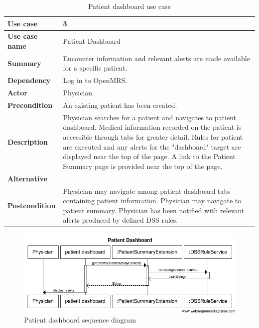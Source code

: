 \documentclass[12pt,letterpaper]{article}
\begin{document}
\begin{table}
\begin{centering}
\begin{tabular}{ |  >{\bfseries}l | p{5in} |} \hline
Use case &
3 \\ \hline
Use case name &
Patient Dashboard \\ \hline
Summary & 
Encounter information and relevant alerts are made available 
for a specific patient. \\ \hline
Dependency &
Log in to OpenMRS. \\ \hline
Actor &
Physician \\ \hline
Precondition &
An existing patient has been created. \\ \hline
Description &
Physician searches for a patient and navigates to patient dashboard. \newline
Medical information recorded on the patient is accessible through tabs for greater detail. \newline
Rules for patient are executed and any alerts for the "dashboard" target 
are displayed near the top of the page. \newline
A link to the Patient Summary page is provided near the top of the page.
\\ \hline
Alternative &
\\ \hline
Postcondition &
Physician may navigate among patient dashboard tabs containing 
patient information. \newline
Physician may navigate to patient summary. \newline
Physician has been notified with relevant alerts produced by defined 
DSS rules.
\\ \hline
\end{tabular}
\end{centering}
\caption{Patient dashboard use case} \label{tab:PATIENT_DASHBOARD_USE_CASE}
\end{table}

\begin{figure}\begin{center}
\includegraphics[width=6.5in]{sequence/patient_dashboard.png}
\end{center}
\caption{Patient dashboard sequence diagram} 
\label{fig:PATIENT_DASHBOARD_SEQUENCE}
\end{figure}
\end{document}

